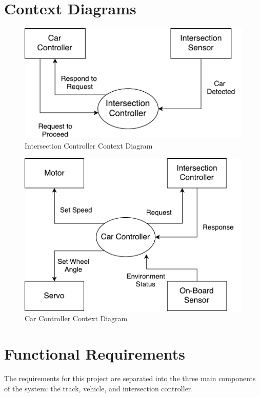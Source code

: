 \documentclass [11pt]{article}
\begin{document}
\section{Context Diagrams}


\begin{figure} [h!]
	\centering
	\includegraphics [scale = 0.8] {figures/IC_ContextDiagram.pdf}
	\caption{Intersection Controller Context Diagram}
\end{figure}
\break
\begin{figure} [h!]
	\centering
	\includegraphics [scale =0.8] {figures/CarCtrl_ContextDiag.pdf}
	\caption{Car Controller Context Diagram}
\end{figure}









\section {Functional Requirements} 
The requirements for this project are separated into the three main components of the system: the track, vehicle, and intersection controller.
\end{document}
